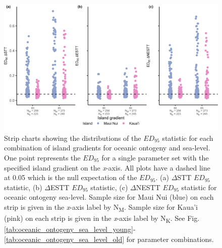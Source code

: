 \begin{figure}
    \centering
    \includegraphics[width=\textwidth]{JBI-21-0508_FigS8.png}
    \caption{Strip charts showing the distributions of the $ED_{95}$ statistic for each combination of island gradients for oceanic ontogeny and sea-level. One point represents the $ED_{95}$ for a single parameter set with the specified island gradient on the \textit{x}-axis. All plots have a dashed line at 0.05 which is the null expectation of the $ED_{95}$. (a) $\Delta$STT $ED_{95}$ statistic, (b) $\Delta$ESTT $ED_{95}$ statistic, (c) $\Delta$NESTT $ED_{95}$ statistic for oceanic ontogeny sea-level. Sample size for Maui Nui (blue) on each strip is given in the \textit{x}-axis label by N\textsubscript{M}. Sample size for Kaua'i (pink) on each strip is given in the \textit{x}-axis label by N\textsubscript{K}.  See Fig. \ref{tab:oceanic_ontogeny_sea_level_young}-\ref{tab:oceanic_ontogeny_sea_level_old} for parameter combinations.}
    \label{fig:oceanic_ontogeny_sea_level_gradient_nltt}
\end{figure}

